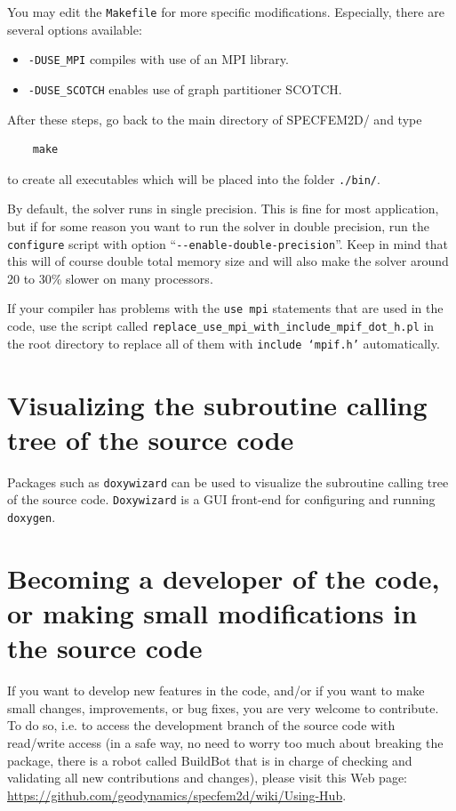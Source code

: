 \documentclass[oneside,english,onecolumn,letterpaper]{book}
\begin{document}
You may edit the \texttt{Makefile} for more specific modifications. Especially, there are several options available:
%
\begin{itemize}
\item \texttt{-DUSE\_MPI} compiles with use of an MPI library.
\item \texttt{-DUSE\_SCOTCH} enables use of graph partitioner SCOTCH.
\end{itemize}
%
After these steps, go back to the main directory of SPECFEM2D/ and type
%
\begin{verbatim}
    make
\end{verbatim}
%
to create all executables which will be placed into the folder \texttt{./bin/}.

By default, the solver runs in single precision. This is fine for most application, but if for some reason
you want to run the solver in double precision, run the \texttt{configure} script with option ``\texttt{-{}-enable-double-precision}''.
Keep in mind that this will of course double total memory size and will also make the solver around 20 to 30\% slower
on many processors.

If your compiler has problems with the \texttt{use mpi} statements that are used in the code, use the script called
\texttt{replace\_use\_mpi\_with\_include\_mpif\_dot\_h.pl} in the root directory to replace all of them with \texttt{include `mpif.h'} automatically.

\section{Visualizing the subroutine calling tree of the source code}

Packages such as \texttt{doxywizard} can be used to visualize the subroutine calling tree of the source code.
\texttt{Doxywizard} is a GUI front-end for configuring and running \texttt{doxygen}.

\section{Becoming a developer of the code, or making small modifications in the source code}

If you want to develop new features in the code, and/or if you want to make small changes, improvements, or bug fixes, you are very welcome to contribute. To do so, i.e. to access the development branch of the source code with read/write access (in a safe way, no need to worry too much about breaking the package, there is a robot called BuildBot that is in charge of checking and validating all new contributions and changes), please visit this Web page: \url{https://github.com/geodynamics/specfem2d/wiki/Using-Hub}.
\end{document}
